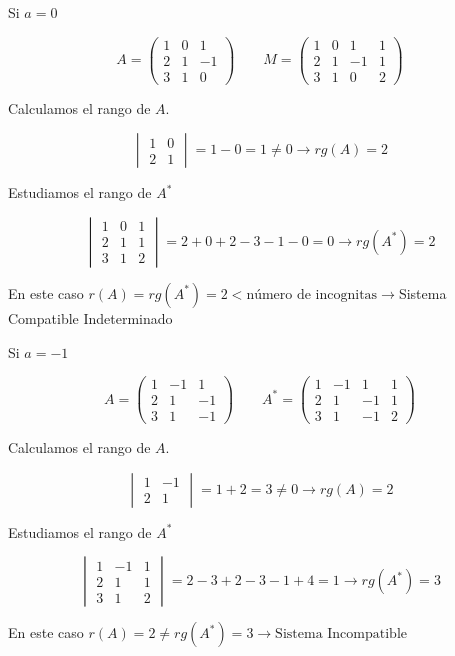 \documentclass[9pt]{beamer}
\begin{document}
\begin{frame}
Si $a=0$ 

\[ A=\begin{pmatrix}
	1 & 0 & 1 \\
	2 & 1 & -1 \\
	3 & 1 & 0
\end{pmatrix}
\qquad
M=\begin{pmatrix}
	1 & 0 & 1 & 1 \\
	2 & 1 & -1 & 1 \\
	3 & 1 & 0 & 2
\end{pmatrix} 
\]

\pause
Calculamos el rango de $A$.

\[ \begin{vmatrix}
	 1 & 0 \\
 	2 & 1
\end{vmatrix}= 1-0=1 \neq 0 \rightarrow rg(A)=2\]

\pause
Estudiamos el rango de $A^*$

\[ \begin{vmatrix}
	1 & 0& 1 \\
	2 & 1 & 1 \\
	3 & 1 & 2
\end{vmatrix}= 2+0+2-3-1-0=0 \rightarrow rg(A^*)=2
\]

\pause
En este caso $r(A)=rg(A^*)=2 < \text{número de incognitas} \rightarrow$Sistema Compatible Indeterminado
\end{frame}

\begin{frame} 

Si $a=-1$ 

\[ A=\begin{pmatrix}
	1 & -1 & 1 \\
	2 & 1 & -1 \\
	3 & 1 & -1
\end{pmatrix}
\qquad
A^*=\begin{pmatrix}
	1 & -1 & 1 & 1 \\
	2 & 1 & -1 & 1 \\
	3 & 1 & -1 & 2
\end{pmatrix} 
\]

\pause
Calculamos el rango de $A$.

\[ \begin{vmatrix}
	 1 & -1 \\
 	2 & 1
\end{vmatrix}= 1+2=3 \neq 0 \rightarrow rg(A)=2\]

\pause
Estudiamos el rango de $A^*$

\[ \begin{vmatrix}
	1 & -1 & 1 \\
	2 & 1 & 1 \\
	3 & 1 & 2
\end{vmatrix}= 2-3+2-3-1+4=1 \rightarrow rg(A^*)=3
\]

En este caso $r(A)=2 \neq rg(A^*)=3 \rightarrow \text{Sistema Incompatible}$
\end{frame}
\end{document}
